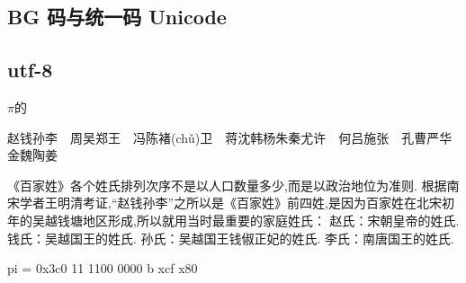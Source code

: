 
\subsection{BG 码与统一码 Unicode}

\subsection{utf-8}


$\pi$的


赵钱孙李　周吴郑王　冯陈褚(chǔ)卫　蒋沈韩杨朱秦尤许　何吕施张　孔曹严华　金魏陶姜

《百家姓》各个姓氏排列次序不是以人口数量多少,而是以政治地位为准则.
根据南宋学者王明清考证,“赵钱孙李”之所以是《百家姓》前四姓,是因为百家姓在北宋初年的吴越钱塘地区形成,所以就用当时最重要的家庭姓氏：
赵氏：宋朝皇帝的姓氏.
钱氏：吴越国王的姓氏.
孙氏：吴越国王钱俶正妃的姓氏.
李氏：南唐国王的姓氏.

pi = 0x3c0   11 1100 0000
b xcf x80

 


